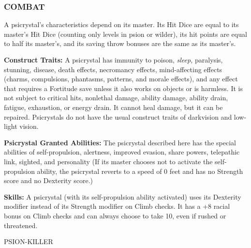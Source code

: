 \documentclass{article}
\begin{document}
\subsubsection*{COMBAT}

A psicrystal's characteristics depend on its master. Its Hit Dice are equal to 
its master's Hit Dice (counting only levels in psion or wilder), its hit points 
are equal to half its master's, and its saving throw bonuses are the same as its 
master's.

\textbf{Construct Traits:} A psicrystal has immunity to poison, \textit{sleep, 
}paralysis, stunning, disease, death effects, necromancy effects, mind-affecting 
effects (charms, compulsions, phantasms, patterns, and morale effects), and any 
effect that requires a Fortitude save unless it also works on objects or is harmless. 
It is not subject to critical hits, nonlethal damage, ability damage, ability drain, 
fatigue, exhaustion, or energy drain. It cannot heal damage, but it can be repaired. 
Psicrystals do not have the usual construct traits of darkvision and low-light 
vision.

\textbf{Psicrystal Granted Abilities:} The psicrystal described here has the special 
abilities of self-propulsion, alertness, improved evasion, share powers, telepathic 
link, sighted, and personality (If its master chooses not to activate the self-propulsion 
ability, the psicrystal reverts to a speed of 0 feet and has no Strength score 
and no Dexterity score.)

\textbf{Skills: }A psicrystal (with its self-propulsion ability activated) uses 
its Dexterity modifier instead of its Strength modifier on Climb checks. It has 
a +8 racial bonus on Climb checks and can always choose to take 10, even if rushed 
or threatened.

\vspace{12pt}
{\LARGE{}PSION-KILLER}
\end{document}

